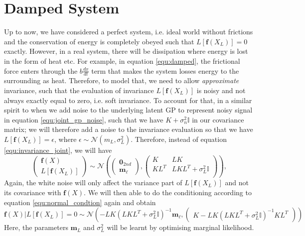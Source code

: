 \documentclass{statsmsc}
\begin{document}
\section{Damped System}
Up to now, we have considered a perfect system, i.e. ideal world without frictions and the conservation of energy is completely obeyed such that $L[\mathbf{f}(X_L)]=0$ exactly.
However, in a real system, there will be dissipation where energy is lost in the form of heat etc.  
For example, in equation \ref{equ:damped}, the frictional force enters through the $b\frac{dx}{dt}$ term that makes the system losses energy to the surrounding as heat.  
Therefore, to model that, we need to allow \textit{approximate} invariance, such that the evaluation of invariance $L[\mathbf{f}(X_L)]$ is noisy and not always exactly equal to zero, i.e. soft invariance.
To account for that, in a similar spirit to when we add noise to the underlying latent GP to represent noisy signal in equation \ref{equ:joint_gp_noise}, such that we have $K+\sigma_n^2 \mathbb{I}$ in our covariance matrix;
we will therefore add a noise to the invariance evaluation so that we have $L[\mathbf{f}(X_L)]=\epsilon$, where $\epsilon\sim\mathcal{N}(m_L, \sigma_L^2)$.
Therefore, instead of equation \ref{equ:invariance_joint}, we will have 
$$
\begin{pmatrix}
\mathbf{f}(X)\\L[\mathbf{f}(X_L)]
\end{pmatrix}
\sim\mathcal{N}
\left(\begin{pmatrix}\mathbf{0}_{2nd}\\\mathbf{m}_{\ell}\end{pmatrix}, \begin{pmatrix}
    K & LK \\
    KL^T & LKL^T+\sigma_L^2\mathbb{I}\\
\end{pmatrix}\right),
$$
Again, the white noise will only affect the variance part of $L[\mathbf{f}(X_L)]$ and not its covariance with $\mathbf{f}(X)$.
We will then able to do the conditioning according to equation \ref{equ:normal_condtion} again and obtain
\begin{equation}
  \mathbf{f}(X)|L[\mathbf{f}(X_L)]=0 \sim \mathcal{N} \left(-LK(LKL^T+\sigma^2_L\mathbb{I})^{-1}\mathbf{m}_\ell, \begin{pmatrix}
    K-LK(LKL^T+\sigma^2_L\mathbb{I})^{-1}KL^T
  \end{pmatrix}\right)
\label{equ:damped_invariance}
\end{equation}
Here, the parameters $\mathbf{m}_L$ and $\sigma^2_L$ will be learnt by optimising marginal likelihood. 
\end{document}
